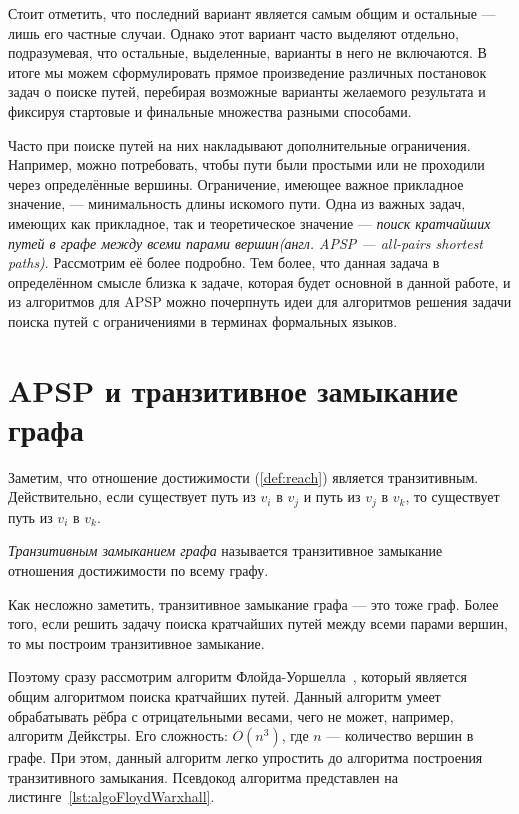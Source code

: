Стоит отметить, что последний вариант является самым общим и остальные --- лишь его частные случаи. 
Однако этот вариант часто выделяют отдельно, подразумевая, что остальные, выделенные, варианты в него не включаются. В итоге мы можем сформулировать прямое произведение различных постановок задач о поиске путей, перебирая возможные варианты желаемого результата и фиксируя стартовые и финальные множества разными способами.

Часто при поиске путей на них накладывают дополнительные ограничения. Например, можно потребовать, чтобы пути были простыми или не проходили через определённые вершины.
Ограничение, имеющее важное прикладное значение, --- минимальность длины искомого пути.
Одна из важных задач, имеющих как прикладное, так и теоретическое значение --- \textit{поиск кратчайших путей в графе между всеми парами вершин(англ. APSP --- all-pairs shortest paths)}. Рассмотрим её более подробно. Тем более, что данная задача в определённом смысле близка к задаче, которая будет основной в данной работе, и из алгоритмов для APSP можно почерпнуть идеи для алгоритмов решения задачи поиска путей с ограничениями в терминах формальных языков.


\section{APSP и транзитивное замыкание графа}

Заметим, что отношение достижимости (\ref{def:reach}) является транзитивным.
Действительно, если существует путь из $v_i$ в $v_j$ и путь из $v_j$ в $v_k$, то существует путь из $v_i$ в $v_k$.

\begin{definition}
  \textit{Транзитивным замыканием графа} называется транзитивное замыкание отношения достижимости по всему графу.
\end{definition}

Как несложно заметить, транзитивное замыкание графа --- это тоже граф.
Более того, если решить задачу поиска кратчайших путей между всеми парами вершин, то мы построим транзитивное замыкание.

Поэтому сразу рассмотрим алгоритм Флойда-Уоршелла~\cite{Floyd1962, Bernard1959, Warshall1962}, который является общим алгоритмом поиска кратчайших путей. Данный алгоритм умеет обрабатывать рёбра с отрицательными весами, чего не может, например, алгоритм Дейкстры. Его сложность: $O(n^3)$, где $n$ --- количество вершин в графе. При этом, данный алгоритм легко упростить до алгоритма построения транзитивного замыкания. Псевдокод алгоритма представлен на листинге~\ref{lst:algoFloydWarxhall}.

